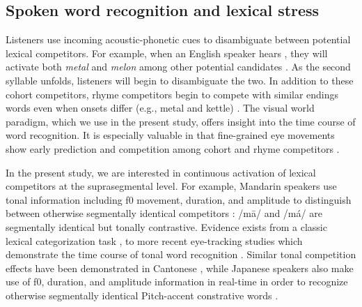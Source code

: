 \subsection{Spoken word recognition and lexical stress}

Listeners use incoming acoustic-phonetic cues to disambiguate between potential lexical competitors. For example, when an English speaker hears , they will activate both \textit{metal} and \textit{melon} among other potential candidates \citep{Marslen1980}. As the second syllable unfolds, listeners will begin to disambiguate the two. In addition to these cohort competitors, rhyme competitors begin to compete with similar endings words even when onsets differ (e.g., metal and kettle) \citep{Allopenna_1998}. The visual world paradigm, which we use in the present study, offers insight into the time course of word recognition. It is especially valuable in that fine-grained eye movements show early prediction and competition among cohort and rhyme competitors \citep{Allopenna_1998}.

In the present study, we are interested in continuous activation of lexical competitors at the suprasegmental level. For example, Mandarin speakers use tonal information including f0 movement, duration, and amplitude \cite[e.g.,][]{Zhang2022} to distinguish between otherwise segmentally identical competitors \cite{Lee2008}: /m\=a/ and /m\'a/ are segmentally identical but tonally contrastive. Evidence exists from a classic lexical categorization task \citep{fox_1985}, to more recent eye-tracking studies which demonstrate the time course of tonal word recognition \citep{zou_2022}. Similar tonal competition effects have been demonstrated in Cantonese \citep{qin_2022, Nixon2016}, while Japanese speakers also make use of f0, duration, and amplitude information in real-time in order to recognize otherwise segmentally identical Pitch-accent constrative words \citep{goss_2014, Cutler1999, Ito2024}.

